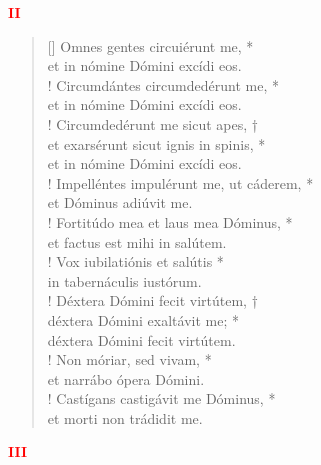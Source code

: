 \begin{center}
\textcolor{red}{\bf II}
\end{center}
\begin{verse}[\versewidth]
Omnes gentes circuiérunt me, *\\
et in nómine Dómini excídi eos.\\!
\vin Circumdántes circumdedérunt me, *\\
\vin et in nómine Dómini excídi eos.\\!
Circumdedérunt me sicut apes, †\\
et exarsérunt sicut ignis in spinis, *\\
et in nómine Dómini excídi eos.\\!
\vin Impelléntes impulérunt me, ut cáderem, *\\
\vin et Dóminus adiúvit me.\\!
Fortitúdo mea et laus mea Dóminus, *\\
et factus est mihi in salútem.\\!
\vin Vox iubilatiónis et salútis *\\
\vin in tabernáculis iustórum.\\!
Déxtera Dómini fecit virtútem, †\\
déxtera Dómini exaltávit me; *\\
déxtera Dómini fecit virtútem.\\!
\vin Non móriar, sed vivam, *\\
\vin et narrábo ópera Dómini.\\!
Castígans castigávit me Dóminus, *\\
et morti non trádidit me.\\
\end{verse}
\begin{center}
\textcolor{red}{\bf III}
\end{center}
